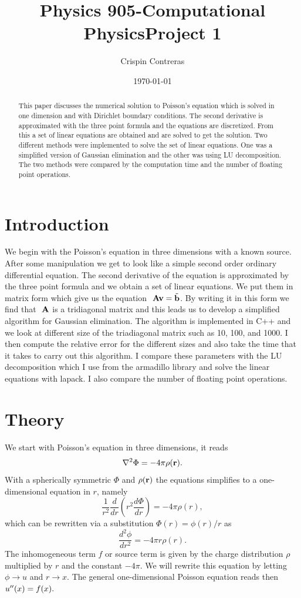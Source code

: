 \documentclass[11pt,a4wide]{article}
\begin{document}
\title{Physics 905-Computational Physics\break Project 1}
\author{Crispin Contreras}
\date{\today}
\maketitle


\begin{abstract}
This paper discusses the numerical solution to Poisson's equation which is solved in
one dimension and with Dirichlet boundary conditions. The second derivative
is approximated with the three point formula and the equations are discretized.
From this a set of linear equations are obtained and are solved to get the solution.
Two different methods were implemented to solve the set of linear equations. One was a simplified version of Gaussian elimination and the other was using LU decomposition. The two methods were compared by the computation time and the number of floating point operations.
\end{abstract}



\section{Introduction}
We begin with the Poisson's equation in three dimensions  with a known source. After some manipulation we get to look like a simple second order ordinary differential equation. The second derivative of the equation is approximated by the three point formula and we obtain a set of linear equations. We put them in matrix form which give us the equation  $\ {\bf A}{\bf v} = \tilde{{\bf b}}$. By writing it in this form we find that $\ {\bf A}$ is a tridiagonal matrix and this leads us to develop a simplified algorithm for Gaussian elimination. The algorithm is implemented in C++ and we look at different size of the triadiagonal matrix such as 10, 100, and 1000. I then  compute the relative error for the different sizes and also take the time that it takes to carry out this algorithm. I compare these parameters with the LU decomposition which I use from the armadillo library and solve the linear equations with lapack. I also compare the number of floating point operations.


\section{Theory}
We start with Poisson's equation in three dimensions, it reads
\[
\nabla^2 \Phi = -4\pi \rho ({\bf r}).
\]
With a spherically symmetric $\Phi$ and $\rho ({\bf r})$  the equations
simplifies to a one-dimensional equation in $r$, namely
\[
\frac{1}{r^2}\frac{d}{dr}\left(r^2\frac{d\Phi}{dr}\right) = -4\pi \rho(r),
\]
which can be rewritten via a substitution $\Phi(r)= \phi(r)/r$ as
\[
\frac{d^2\phi}{dr^2}= -4\pi r\rho(r).
\]
The inhomogeneous term $f$ or source term is given by the charge distribution $\rho$  multiplied by $r$ and the constant $-4\pi$. We will rewrite this equation by letting $\phi\rightarrow u$ and 
$r\rightarrow x$. The general one-dimensional Poisson equation reads then $\-u''(x) = f(x).$
\end{document}
